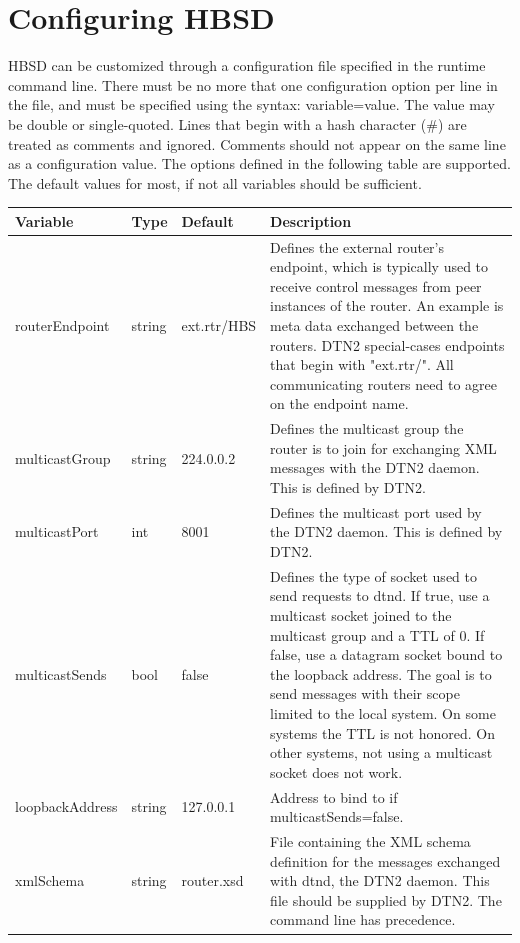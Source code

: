 \section{Configuring HBSD}

HBSD can be customized through a configuration file specified in the runtime command line.  
There must be no more that one configuration option per line in the file, and must be specified using the syntax: variable=value. The value may be double or single-quoted. Lines that begin with a hash character ($\#$) are treated as comments and ignored. Comments should not appear on the same line as a configuration value. The options defined in the following table are supported. The default values for most, if not all variables should be sufficient.

\begin{longtable}[!h]{|p{4cm}|p{1cm}|p{2cm}|p{5cm}|}
\hline
\textbf{Variable}& \textbf{Type} & \textbf{Default} & \textbf{Description} \\
\hline
routerEndpoint &  string & ext.rtr/HBS & Defines the external router's endpoint, which is typically  used to receive control 
messages from peer  instances of the router. An 
example is meta data exchanged between the 
routers. DTN2 special-cases endpoints that begin with 
"ext.rtr/". All communicating routers need to agree on the  endpoint name.\\
\hline
multicastGroup & string &  224.0.0.2 & Defines the multicast group the router is to join for  exchanging XML messages 
with the DTN2 daemon. This is defined by DTN2.\\
\hline
multicastPort & int & 8001 & Defines the multicast port  used by the DTN2 daemon. This is defined by DTN2.\\
\hline
multicastSends & bool & false & Defines the type of socket used to send requests to
dtnd. If true, use a multicast socket joined to the multicast group and a TTL of 0. If false, use a datagram socket bound to the 
loopback address. The goal is to send messages with their scope limited to the 
local system. On some systems the TTL is not honored. On other systems, not using a multicast socket does not work. \\
\hline
loopbackAddress & string & 127.0.0.1 & Address to bind to if multicastSends=false.\\
\hline
xmlSchema & string  & router.xsd& File containing the XML schema definition for the 
messages exchanged with dtnd, the DTN2 daemon. This file should be supplied by DTN2. The command line has precedence.\\

\end{longtable}
